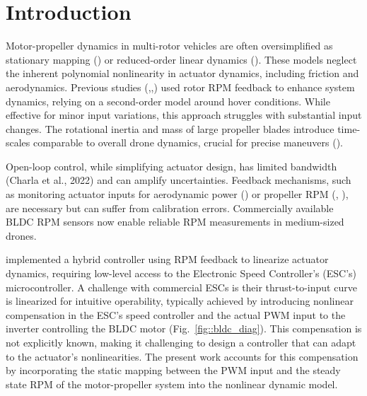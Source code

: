 \section{Introduction}
Motor-propeller dynamics in multi-rotor vehicles are often oversimplified as
stationary mapping (\cite{tayebi2006attitude}) or reduced-order linear dynamics
(\cite{pounds2010modelling}). These models neglect the inherent polynomial
nonlinearity in actuator dynamics, including friction and aerodynamics. Previous
studies (\cite{pounds2009design},\cite{pounds2007system},\cite{mahony2012multirotor}) used rotor RPM feedback to enhance system
dynamics, relying on a second-order model around hover conditions. While
effective for minor input variations, this approach struggles with substantial
input changes. The rotational inertia and mass of large propeller blades
introduce time-scales comparable to overall drone dynamics, crucial for precise
maneuvers (\cite{hamandi2021design}).

Open-loop control, while simplifying actuator design, has limited bandwidth (Charla et al., 2022) and can amplify uncertainties. Feedback mechanisms, such as monitoring actuator inputs for aerodynamic power (\cite{B_Manony}) or propeller RPM (\cite{franchi2017adaptive}, \cite{bangura2017thrust}), are necessary but can suffer from calibration errors. Commercially available BLDC RPM sensors now enable reliable RPM measurements in medium-sized drones.

\cite{franchi2017adaptive} implemented a hybrid controller using RPM feedback to
linearize actuator dynamics, requiring low-level access to the Electronic Speed
Controller's (ESC's) microcontroller. A challenge with commercial ESCs is their
thrust-to-input curve is linearized for intuitive operability, typically
achieved by introducing nonlinear compensation in the ESC's speed controller and
the actual PWM input to the inverter controlling the BLDC motor
(Fig.~\ref{fig::bldc_diag}). This compensation is not explicitly known, making
it challenging to design a controller that can adapt to the actuator's
nonlinearities. The present work accounts for this compensation by incorporating
the static mapping between the PWM input and the steady state RPM of the
motor-propeller system into the nonlinear dynamic model.

